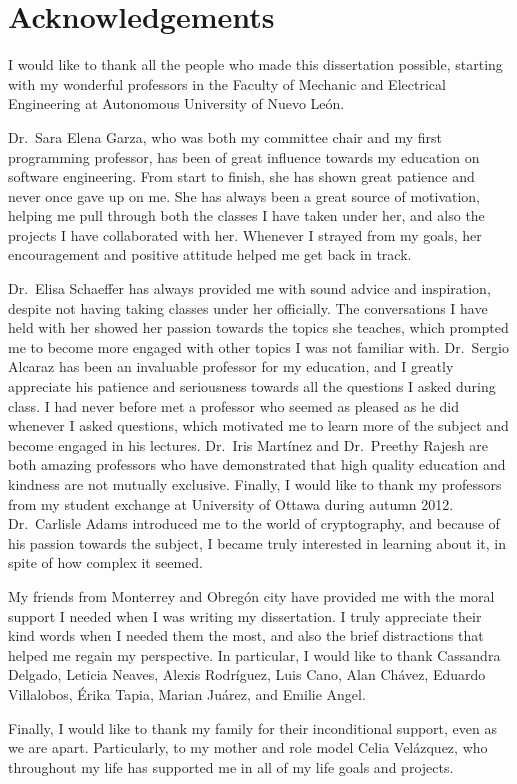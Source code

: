 \chapter*{Acknowledgements}

I would like to thank all the people who made this dissertation possible, starting with my wonderful professors in the Faculty of Mechanic and Electrical Engineering at Autonomous University of Nuevo Le\'{o}n. 

Dr.\ Sara Elena Garza, who was both my committee chair and my first programming professor, has been of great influence towards my education on software engineering. From start to finish, she has shown great patience and never once gave up on me. She has always been a great source of motivation, helping me pull through both the classes I have taken under her, and also the projects I have collaborated with her. Whenever I strayed from my goals, her encouragement and positive attitude helped me get back in track. 

Dr.\ Elisa Schaeffer has always provided me with sound advice and inspiration, despite not having taking classes under her officially. The conversations I have held with her showed her passion towards the topics she teaches, which prompted me to become more engaged with other topics I was not familiar with. Dr.\ Sergio Alcaraz has been an invaluable professor for my education, and I greatly appreciate his patience and seriousness towards all the questions I asked during class. I had never before met a professor who seemed as pleased as he did whenever I asked questions, which motivated me to learn more of the subject and become engaged in his lectures. Dr.\ Iris Mart\'{i}nez and Dr.\ Preethy Rajesh are both amazing professors who have demonstrated that high quality education and kindness are not mutually exclusive. Finally, I would like to thank my professors from my student exchange at University of Ottawa during autumn 2012. Dr.\ Carlisle Adams introduced me to the world of cryptography, and because of his passion towards the subject, I became truly interested in learning about it, in spite of how complex it seemed.

My friends from Monterrey and Obreg\'{o}n city have provided me with the moral support I needed when I was writing my dissertation. I truly appreciate their kind words when I needed them the most, and also the brief distractions that helped me regain my perspective. In particular, I would like to thank Cassandra Delgado, Leticia Neaves, Alexis Rodr\'{i}guez, Luis Cano, Alan Ch\'{a}vez, Eduardo Villalobos, \'{E}rika Tapia, Marian Ju\'{a}rez, and Emilie Angel.

Finally, I would like to thank my family for their inconditional support, even as we are apart. Particularly, to my mother and role model Celia Vel\'{a}zquez, who throughout my life has supported me in all of my life goals and projects. 

\newpage
